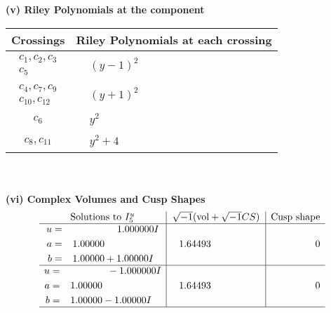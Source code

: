 \documentclass[1p]{elsarticle_modified}
\theoremstyle{definition}
\newcommand{\I}{\sqrt{-1}}
\begin{document}
\newpage\renewcommand{\arraystretch}{1}
\flushleft \textbf{(v) Riley Polynomials at the component}\newline \\
\begin{tabular}{m{50pt}|m{274pt}}
Crossings & \hspace{64pt}Riley Polynomials at each crossing \\
\hline $$\begin{aligned}c_{1},c_{2},c_{3}\\c_{5}\end{aligned}$$&$\begin{aligned}
&(y-1)^2
\end{aligned}$\\
\hline $$\begin{aligned}c_{4},c_{7},c_{9}\\c_{10},c_{12}\end{aligned}$$&$\begin{aligned}
&(y+1)^2
\end{aligned}$\\
\hline $$\begin{aligned}c_{6}\end{aligned}$$&$\begin{aligned}
&y^2
\end{aligned}$\\
\hline $$\begin{aligned}c_{8},c_{11}\end{aligned}$$&$\begin{aligned}
&y^2+4
\end{aligned}$\\
\hline
\end{tabular}\\~\\
\newpage\flushleft \textbf{(vi) Complex Volumes and Cusp Shapes}
$$\begin{array}{c|c|c}  
\text{Solutions to }I^u_{5}& \I (\text{vol} + \sqrt{-1}CS) & \text{Cusp shape}\\
 \hline 
\begin{aligned}
u &= \phantom{-0.000000 -}1.000000 I \\
a &= \phantom{-}1.00000\phantom{ +0.000000I} \\
b &= \phantom{-}1.00000 + 1.00000 I\end{aligned}
 & \phantom{-}1.64493\phantom{ +0.000000I} & \phantom{-0.000000 } 0 \\ \hline\begin{aligned}
u &= \phantom{-0.000000 } -1.000000 I \\
a &= \phantom{-}1.00000\phantom{ +0.000000I} \\
b &= \phantom{-}1.00000 - 1.00000 I\end{aligned}
 & \phantom{-}1.64493\phantom{ +0.000000I} & \phantom{-0.000000 } 0\\
 \hline 
 \end{array}$$\newpage\newpage\renewcommand{\arraystretch}{1}
\end{document}
